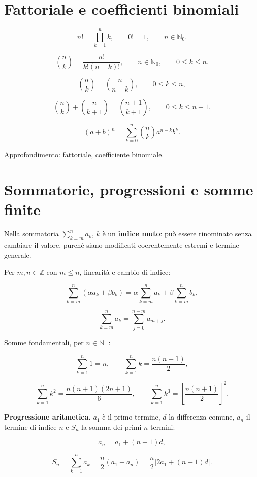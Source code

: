 \section{Fattoriale e coefficienti binomiali}\label{fattoriale-e-coefficienti-binomiali}

\[
n!=\prod_{k=1}^n k,
\qquad
0!=1,
\qquad
n\in\mathbb N_0.
\]

\[
\binom nk=\frac{n!}{k!(n-k)!},
\qquad
n\in\mathbb N_0,
\qquad
0\le k\le n.
\]

\[
\binom nk=\binom n{n-k},
\qquad 0\le k\le n,
\]

\[
\binom nk+\binom n{k+1}=\binom{n+1}{k+1},
\qquad 0\le k\le n-1.
\]

\[
(a+b)^n=\sum_{k=0}^n\binom nk a^{n-k}b^k.
\]

Approfondimento: \href{https://ingegnerismo.it/matematica/fattoriale/}{fattoriale}, \href{https://ingegnerismo.it/matematica/coefficiente-binomiale/}{coefficiente binomiale}.

\section{Sommatorie, progressioni e somme finite}\label{sommatorie-progressioni-e-somme-finite}

Nella sommatoria \(\sum_{k=m}^{n}a_k\), \(k\) è un \textbf{indice muto}: può essere rinominato senza cambiare il valore, purché siano modificati coerentemente estremi e termine generale.

Per \(m,n\in\mathbb Z\) con \(m\le n\), linearità e cambio di indice:

\[
\sum_{k=m}^{n}(\alpha a_k+\beta b_k)
=
\alpha\sum_{k=m}^{n}a_k
+
\beta\sum_{k=m}^{n}b_k,
\]

\[
\sum_{k=m}^{n}a_k
=
\sum_{j=0}^{n-m}a_{m+j}.
\]

Somme fondamentali, per \(n\in\mathbb N_+\):

\[
\sum_{k=1}^{n}1=n,
\qquad
\sum_{k=1}^{n}k=\frac{n(n+1)}2,
\]

\[
\sum_{k=1}^{n}k^2=\frac{n(n+1)(2n+1)}6,
\qquad
\sum_{k=1}^{n}k^3=\left[\frac{n(n+1)}2\right]^2.
\]

\textbf{Progressione aritmetica.} \(a_1\) è il primo termine, \(d\) la differenza comune, \(a_n\) il termine di indice \(n\) e \(S_n\) la somma dei primi \(n\) termini:

\[
a_n=a_1+(n-1)d,
\]

\[
S_n=\sum_{k=1}^{n}a_k
=\frac n2(a_1+a_n)
=\frac n2\bigl[2a_1+(n-1)d\bigr].
\]

